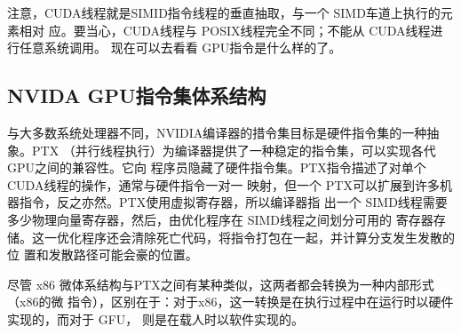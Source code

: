 注意，CUDA线程就是SIMID指令线程的垂直抽取，与一个 SIMD车道上执行的元素相对
应。要当心，CUDA线程与 POSIX线程完全不同；不能从 CUDA线程进行任意系统调用。
现在可以去看看 GPU指令是什么样的了。

\subsection{NVIDA GPU指令集体系结构}

与大多数系统处理器不同，NVIDIA编译器的措令集目标是硬件指令集的一种抽象。PTX
（并行线程执行）为编译器提供了一种稳定的指令集，可以实现各代 GPU之间的兼容性。它向
程序员隐藏了硬件指令集。PTX指令描述了对单个 CUDA线程的操作，通常与硬件指令一对一
映射，但一个 PTX可以扩展到许多机器指令，反之亦然。PTX使用虚拟寄存器，所以编译器指
出一个 SIMD线程需要多少物理向量寄存器，然后，由优化程序在 SIMD线程之间划分可用的
寄存器存储。这一优化程序还会清除死亡代码，将指令打包在一起，并计算分支发生发散的位
置和发散路径可能会豪的位置。

尽管 x86 微体系结构与PTX之间有某种类似，这两者都会转换为一种内部形式（x86的微
指令），区别在于：对于x86，这一转换是在执行过程中在运行时以硬件实现的，而对于 GFU，
则是在载人时以软件实现的。


